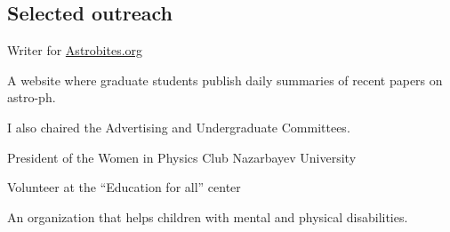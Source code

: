 \documentclass[10pt]{article} %
\begin{document}
\begin{paracol}{1}




	

	
	
	
	
\section{Selected outreach}
	{Writer for \href{https://astrobites.org/author/ssagynbayeva/}{Astrobites.org}}
	{A website where graduate students publish daily summaries of recent papers on astro-ph.
	
	I also chaired the Advertising and Undergraduate Committees.}

	
	
	
	{President of the Women in Physics Club}
	{Nazarbayev University}
	

	{Volunteer at the “Education for all” center}
	{An organization that helps children with mental and physical disabilities. 
	
}
\end{paracol}
\end{document}
